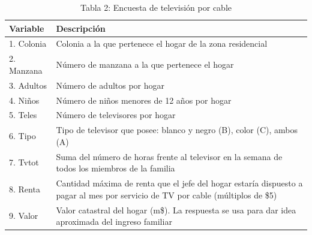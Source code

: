 \documentclass[10pt]{article}
\begin{document}
\begin{table}[H]
    \centering
    \caption{Tabla 2: Encuesta de televisión por cable}
    \label{tab:cable_vars}
    \begin{tabular}{|p{2.8cm}|p{10.5cm}|}
        \hline
        \textbf{Variable} & \textbf{Descripción} \\
        \hline
        1. Colonia & Colonia a la que pertenece el hogar de la zona residencial \\
        \hline
        2. Manzana & Número de manzana a la que pertenece el hogar \\
        \hline
        3. Adultos & Número de adultos por hogar \\
        \hline
        4. Niños & Número de niños menores de 12 años por hogar \\
        \hline
        5. Teles & Número de televisores por hogar \\
        \hline
        6. Tipo & Tipo de televisor que posee: blanco y negro (B), color (C), ambos (A) \\
        \hline
        7. Tvtot & Suma del número de horas frente al televisor en la semana de todos los miembros de la familia \\
        \hline
        8. Renta & Cantidad máxima de renta que el jefe del hogar estaría dispuesto a pagar al mes por servicio de TV por cable (múltiplos de \$5) \\
        \hline
        9. Valor & Valor catastral del hogar (m\$). La respuesta se usa para dar idea aproximada del ingreso familiar \\
        \hline
    \end{tabular}
\end{table}
\end{document}
